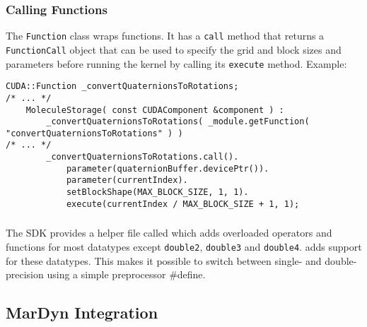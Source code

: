 \subsubsection{Calling \cuda{} Functions}
The \lstinline!Function! class wraps \cuda{} functions. It has a \lstinline!call! method that returns a \lstinline!FunctionCall! object that can be used to specify the grid and block sizes and parameters before running the \cuda{} kernel by calling its \lstinline!execute! method.
Example:
\begin{lstlisting}[label=cudafunctionhelpers,caption=CUDA helper classes for Function Calls]
	CUDA::Function _convertQuaternionsToRotations;
/* ... */		
	MoleculeStorage( const CUDAComponent &component ) :
		_convertQuaternionsToRotations( _module.getFunction( "convertQuaternionsToRotations" ) )
/* ... */
		_convertQuaternionsToRotations.call().
			parameter(quaternionBuffer.devicePtr()).
			parameter(currentIndex).
			setBlockShape(MAX_BLOCK_SIZE, 1, 1).
			execute(currentIndex / MAX_BLOCK_SIZE + 1, 1);
\end{lstlisting}

\subsubsection{}
The \cuda{} SDK provides a helper file called  which adds overloaded operators and functions for most \cuda{} datatypes except \lstinline!double2!, \lstinline!double3! and \lstinline!double4!.
 adds support for these datatypes.
This makes it possible to switch between single- and double-precision using a simple preprocessor \#define.

\subsection{MarDyn Integration}